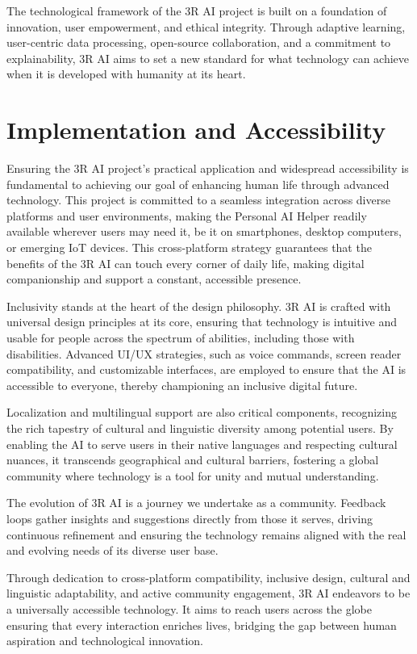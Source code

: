 \documentclass[12pt]{article}
\begin{document}
The technological framework of the 3R AI project is built on a foundation of innovation, user empowerment, and ethical integrity. Through adaptive learning, user-centric data processing, open-source collaboration, and a commitment to explainability, 3R AI aims to set a new standard for what technology can achieve when it is developed with humanity at its heart.

\section*{Implementation and Accessibility}

Ensuring the 3R AI project's practical application and widespread accessibility is fundamental to achieving our goal of enhancing human life through advanced technology. This project is committed to a seamless integration across diverse platforms and user environments, making the Personal AI Helper readily available wherever users may need it, be it on smartphones, desktop computers, or emerging IoT devices. This cross-platform strategy guarantees that the benefits of the 3R AI can touch every corner of daily life, making digital companionship and support a constant, accessible presence.

Inclusivity stands at the heart of the design philosophy. 3R AI is crafted with universal design principles at its core, ensuring that technology is intuitive and usable for people across the spectrum of abilities, including those with disabilities. Advanced UI/UX strategies, such as voice commands, screen reader compatibility, and customizable interfaces, are employed to ensure that the AI is accessible to everyone, thereby championing an inclusive digital future.

Localization and multilingual support are also critical components, recognizing the rich tapestry of cultural and linguistic diversity among potential users. By enabling the AI to serve users in their native languages and respecting cultural nuances, it transcends geographical and cultural barriers, fostering a global community where technology is a tool for unity and mutual understanding.

The evolution of 3R AI is a journey we undertake as a community. Feedback loops gather insights and suggestions directly from those it serves, driving continuous refinement and ensuring the technology remains aligned with the real and evolving needs of its diverse user base.

Through dedication to cross-platform compatibility, inclusive design, cultural and linguistic adaptability, and active community engagement, 3R AI endeavors to be a universally accessible technology. It aims to reach users across the globe ensuring that every interaction enriches lives, bridging the gap between human aspiration and technological innovation.
\end{document}
